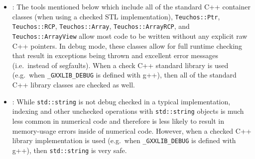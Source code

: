 \begin{itemize}

{}\item\GCGAvoidRawPointers: The tools mentioned below which include
all of the standard C++ container classes (when using a checked STL
implementation), {}\texttt{Teuchos::\-Ptr}, {}\texttt{Teuchos::\-RCP},
{}\texttt{Teuchos::\-Array}, {}\texttt{Teuchos::\-Array\-RCP}, and
{}\texttt{Teuchos::\-Array\-View} allow most code to be written
without any explicit raw C++ pointers.  In debug mode, these classes
allow for full runtime checking that result in exceptions being thrown
and excellent error messages (i.e.\ instead of segfaults).  When a
check C++ standard library is used (e.g.\ when
{}\texttt{\_GXXLIB\_DEBUG} is defined with g++), then all of the
standard C++ library classes are checked as well.

{}\item\GCGUseStdString: While {}\texttt{std\-::string} is not debug
checked in a typical implementation, indexing and other unchecked
operations with {}\texttt{std\-::string} objects is much less common
in numerical code and therefore is less likely to result in
memory-usage errors inside of numerical code.  However, when a checked
C++ library implementation is used (e.g.\ when
{}\texttt{\_GXXLIB\_DEBUG} is defined with g++), then
{}\texttt{std\-::string} is very safe.


\end{itemize}
